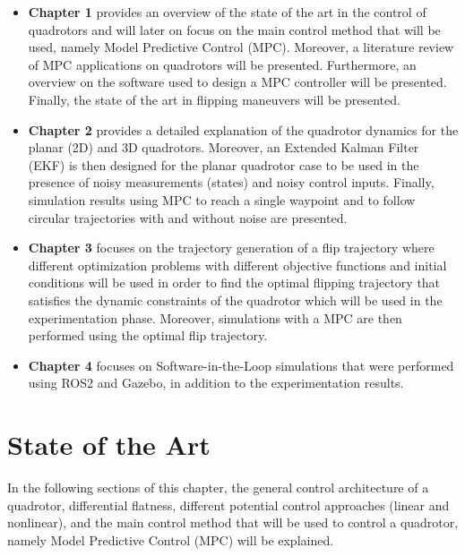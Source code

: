 \documentclass{thesisreport}
\begin{document}
\begin{itemize}
\setlength{\itemindent}{-.5in}
	\item [] \textbf{Chapter 1} provides an overview of the state of the art in the control of quadrotors and will later on focus on the main control method that will be used, namely Model Predictive Control (MPC). Moreover, a literature review of MPC applications on quadrotors will be presented. Furthermore, an overview on the software used to design a MPC controller will be presented. Finally, the state of the art in flipping maneuvers will be presented.
	
	 \item [] \textbf{Chapter 2} provides a detailed explanation of the quadrotor dynamics for the planar (2D) and 3D quadrotors. Moreover, an Extended Kalman Filter (EKF) is then designed for the planar quadrotor case to be used in the presence of noisy measurements (states) and noisy control inputs. Finally, simulation results using MPC to reach a single waypoint and to follow circular trajectories with and without noise are presented.
	 
	 \item [] \textbf{Chapter 3} focuses on the trajectory generation of a flip trajectory where different optimization problems with different objective functions and initial conditions will be used in order to find the optimal flipping trajectory that satisfies the dynamic constraints of the quadrotor which will be used in the experimentation phase. Moreover, simulations with a MPC are then performed using the optimal flip trajectory.
	 
	 \item [] \textbf{Chapter 4} focuses on Software-in-the-Loop simulations that were performed using ROS2 and Gazebo, in addition to the experimentation results.
\end{itemize}


\newpage
 
 \chapter{State of the Art}
 
 In the following sections of this chapter,  the general control architecture of a quadrotor, differential flatness, different potential control approaches (linear and nonlinear), and the main control method that will be used to control a quadrotor, namely Model Predictive Control (MPC) will be explained. 
 
\end{document}
